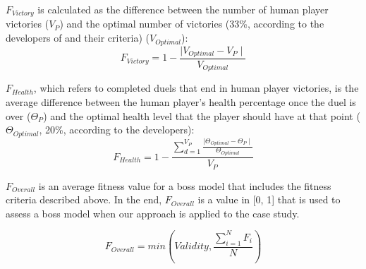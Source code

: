 $F_{Victory}$ is calculated as the difference between the number of human player victories ($V_{P}$) and the optimal number of victories (33\%, according to the developers of \CaseStudy{} and their criteria) ($V_{Optimal}$):
\begin{equation}
F_{Victory} = 1 -\frac{\mid V_{Optimal} - V_{P} \mid}{ V_{Optimal}}
\end{equation}

$F_{Health}$, which refers to completed duels that end in human player victories, is the average difference between the human player's health percentage once the duel is over ($\Theta_{P}$) and the optimal health level that the player should have at that point ($\Theta_{Optimal}$, 20\%, according to the developers):
\begin{equation}
F_{Health} = 1 - \frac{\sum\limits_{d=1}^{V_{P}}\frac{\mid \Theta_{Optimal} - \Theta_{P} \mid}{ \Theta_{Optimal}}}{V_{P}}
\end{equation}

$F_{Overall}$ is an average fitness value for a boss model that includes the fitness criteria described above. In the end, $F_{Overall}$ is a value in [0, 1] that is used to assess a boss model when our \ApproachName{} approach is applied to the \CaseStudy{} case study.

\begin{equation}
F_{Overall} = min( Validity, \frac{\sum\limits_{i=1}^{N}F_{i}}{N} )
\end{equation}
